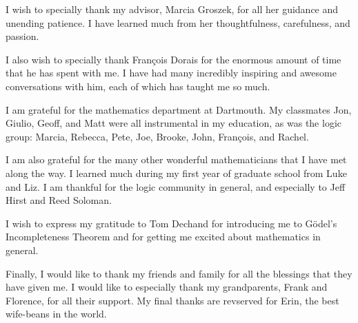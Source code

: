 I wish to specially thank my advisor, Marcia Groszek, for all her guidance and unending patience.
I have learned much from her thoughtfulness, carefulness, and passion.

I also wish to specially thank Fran\c{c}ois Dorais for the enormous amount of
time that he has spent with me.
I have had many incredibly inspiring and awesome conversations
with him, each of which has taught me so much.

I am grateful for the mathematics department at Dartmouth.
My classmates Jon, Giulio, Geoff, and Matt were all instrumental in my education,
as was the logic group: Marcia, Rebecca, Pete, Joe, Brooke, John, Fran\c{c}ois, and Rachel.

I am also grateful for the many other wonderful mathematicians that I have met along the way.
I learned much during my first year of graduate school from Luke and Liz.
I am thankful for the logic community in general, and especially to Jeff Hirst and Reed Soloman.

I wish to express my gratitude to Tom Dechand for introducing me to
G\"{o}del's Incompleteness Theorem and for getting me excited about mathematics in general.

Finally, I would like to thank my friends and family for all the blessings that they have given me.
I would like to especially thank my grandparents, Frank and Florence, for all their support.
My final thanks are revserved for Erin, the best wife-beans in the world.
